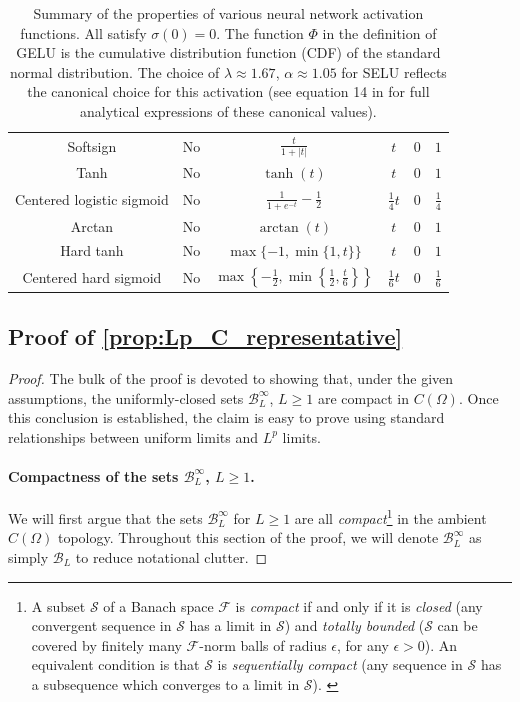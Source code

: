 \documentclass{article}
\def\cB{{\mathcal{B}}}
\def\cF{{\mathcal{F}}}
\def\cS{{\mathcal{S}}}
\begin{document}
\begin{appendices}
\begin{table}[ht]
{\begin{tabular}{c|c|c|c|c|c}
Softsign 
& No
& $\frac{t}{1+|t|}$
& $t$
& $0$ 
& $1$ \\[1pt]

Tanh 
& No
& $\tanh(t)$
& $t$
& $0$ 
& $1$ \\[1pt]

Centered logistic sigmoid 
& No
& $\frac{1}{1+e^{-t}} - \frac{1}{2}$
& $\frac{1}{4}t$
& $0$ 
& $\frac{1}{4}$ \\[1pt]

Arctan 
& No
& $\arctan(t)$
& $t$
& $0$ 
& $1$ \\[1pt]

Hard tanh 
& No
& $\max\{-1,\min\{1,t\}\}$
& $t$
& $0$ 
& $1$ \\[1pt]

Centered hard sigmoid 
& No
& $\max\left\{-\frac{1}{2}, \min\left\{\frac{1}{2}, \frac{t}{6}\right\}\right\}$
& $\frac{1}{6}t$
& $0$ 
& $\frac{1}{6}$ \\[2pt]
\hline
\end{tabular}%
}
\endgroup
\caption{Summary of the properties of various neural network activation functions. All satisfy $\sigma(0) = 0$. The function $\Phi$ in the definition of GELU is the cumulative distribution function (CDF) of the standard normal distribution. The choice of $\lambda \approx 1.67$, $\alpha \approx 1.05$ for SELU reflects the canonical choice for this activation (see equation 14 in \cite{klambauer2017self} for full analytical expressions of these canonical values).}
\label{tab:activation_summary}
\end{table}

\subsection{Proof of \cref{prop:Lp_C_representative}}

\label{appendix:Lp_C_representative_proof}
\begin{proof}
    The bulk of the proof is devoted to showing that, under the given assumptions, the uniformly-closed sets $\cB_L^\infty$, $L \geq 1$ are compact in $C(\Omega)$. Once this conclusion is established, the claim is easy to prove using standard relationships between uniform limits and $L^p$ limits.
    \paragraph{Compactness of the sets $\cB_L^\infty$, $L \geq 1$.} We will first argue that the sets $\cB_{L}^\infty$ for $L \geq 1$ are all \textit{compact}\footnote{A subset $\cS$ of a Banach space $\cF$ is \textit{compact} if and only if it is \textit{closed} (any convergent sequence in $\cS$ has a limit in $\cS$) and \textit{totally bounded} ($\cS$ can be covered by finitely many $\cF$-norm balls of radius $\epsilon$, for any $\epsilon > 0$). An equivalent condition is that $\cS$ is \textit{sequentially compact} (any sequence in $\cS$ has a subsequence which converges to a limit in $\cS$). \label{footnote:compact_def}} in the ambient $C(\Omega)$ topology. Throughout this section of the proof, we will denote $\cB_L^\infty$ as simply $\cB_L$ to reduce notational clutter. 
    

\end{proof}
\end{appendices}
\end{document}
